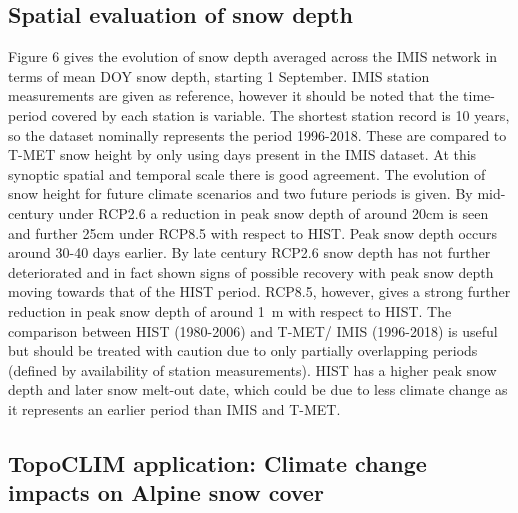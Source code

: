 \documentclass[hess, manuscript]{copernicus}
\begin{document}
\subsection{Spatial evaluation of snow depth}
Figure 6 gives the evolution of snow depth averaged across the IMIS network in terms of mean DOY snow depth, starting 1 September. IMIS station measurements are given as reference, however it should be noted that the time-period covered by each station is variable. The shortest station record is 10 years, so the dataset nominally represents the period 1996-2018. These are compared to T-MET snow height by only using days present in the IMIS dataset. At this synoptic spatial and temporal scale there is good agreement. The evolution of snow height for future climate scenarios and two future periods is given. By mid-century under RCP2.6 a reduction in peak snow depth of around 20\unit{cm} is seen and further 25\unit{cm} under RCP8.5 with respect to HIST. Peak snow depth occurs around 30-40 days earlier. By late century RCP2.6 snow depth has not further deteriorated and in fact shown signs of possible recovery with peak snow depth moving towards that of the HIST period. RCP8.5, however, gives a strong further reduction in peak snow depth of around 1~m with respect to HIST.   
The comparison between HIST (1980-2006) and T-MET/ IMIS (1996-2018) is useful but should be treated with caution due to only partially overlapping periods (defined by availability of station measurements). HIST has a higher peak snow depth and later snow melt-out date, which could be due to less climate change as it represents an earlier period than IMIS and T-MET. 



\subsection{TopoCLIM application: Climate change impacts on Alpine snow cover}
\end{document}
